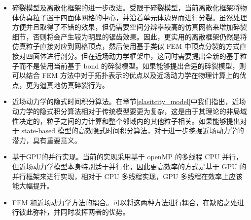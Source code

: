 \begin{itemize}
  \item 碎裂模型及离散化框架的进一步改进。受限于碎裂模型，当前离散化框架将物体仿真粒子置于四面体网格的中心，并沿着单元体边界而进行分裂。虽然处理方便并且取得了不错的效果，但仍需要空间分辨率较高的仿真网格来增加碎裂细节，否则将会产生较为明显的锯齿效果。因此，更实用的离散框架仍然是将仿真粒子直接对应到网格顶点，然后使用基于类似 FEM 中顶点分裂的方式直接对四面体进行剖分。但在近场动力学框架中，这同时需要提出全新的基于粒子而不是使用当前基于 bond 的碎裂模型。如果能够提出合适的碎裂模型，则可以结合 FEM 方法中对于拓扑表示的优点以及近场动力学在物理计算上的优点，更为逼真地仿真碎裂行为。
  \item 近场动力学的隐式时间积分算法。在章节\ref{elasitcity_model}中我们指出，近场动力学的隐式积分算法相对于传统模型要更为复杂，这是由于其理论的非局域性决定的，粒子之间的力计算和整个邻域内的其他粒子相关。如果能够提出对于 state-based 模型的高效隐式时间积分算法，对于进一步挖掘近场动力学的潜力，具有重要意义。
  \item 基于GPU的并行实现。当前的实现采用基于 openMP 的多线程 CPU 并行，但近场动力学模型本身特别适于并行化，因此更高效率的方式是基于 GPU 的并行框架来进行实现，相对于 CPU 多线程实现，GPU 多线程在效率上应该能大幅提升。
  \item FEM 和近场动力学方法的耦合。可以将这两种方法进行耦合，在缺陷之处进行彼此弥补，并同时发挥两者的优势。
\end{itemize}
